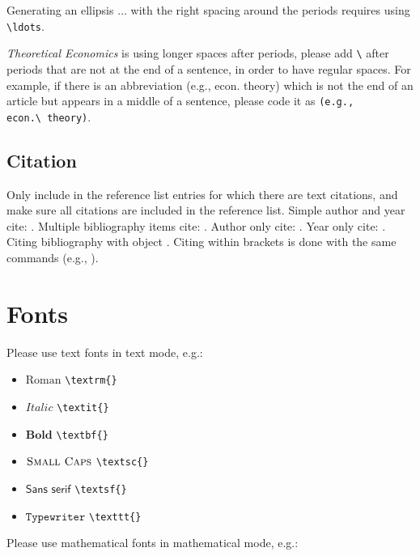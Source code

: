 \documentclass[qe,nameyear,final]{econsocart}
\begin{document}
Generating an ellipsis $\ldots$ with the right spacing
around the periods requires using \texttt{{\textbackslash}ldots}.

\textit{Theoretical Economics} is using longer spaces after periods, please add \texttt{{\textbackslash}} after periods that are not at the end of a sentence, in order to have regular spaces. For example, if there is an abbreviation (e.g., econ. theory) which is not the end of an article but appears in a middle of a sentence, please code it as \texttt{(e.g., econ.{\textbackslash}~theory)}.

\subsection{Citation}

Only include in the reference list entries for which there are text citations,
and make sure all citations are included in the reference list.
Simple author and year cite: \citet{b1}.
Multiple bibliography items cite: \citet{b2, b3, b4, b5}.
Author only cite: \citet{b4}.
Year only cite: . Citing bibliography with object \cite{b1}. Citing within brackets is done with the same commands (e.g., \citet{b2, b3, b4}).

\section{Fonts}

Please use text fonts in text mode, e.g.:

\begin{itemize}
\item $\textrm{Roman}$ \texttt{{\textbackslash}textrm\{\}}
\item $\textit{Italic}$ \texttt{{\textbackslash}textit\{\}}
\item $\textbf{Bold}$ \texttt{{\textbackslash}textbf\{\}}
\item $\textsc{Small Caps}$ \texttt{{\textbackslash}textsc\{\}}
\item $\textsf{Sans serif}$ \texttt{{\textbackslash}textsf\{\}}
\item $\texttt{Typewriter}$ \texttt{{\textbackslash}texttt\{\}}
\end{itemize}

Please use mathematical fonts in mathematical mode, e.g.:
\end{document}
